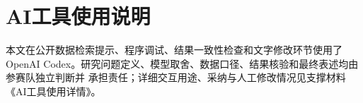 \section*{AI工具使用说明}

本文在公开数据检索提示、程序调试、结果一致性检查和文字修改环节使用了OpenAI Codex。研究问题定义、模型取舍、数据口径、结果核验和最终表述均由参赛队独立判断并
承担责任；详细交互用途、采纳与人工修改情况见支撑材料《AI工具使用详情》。
